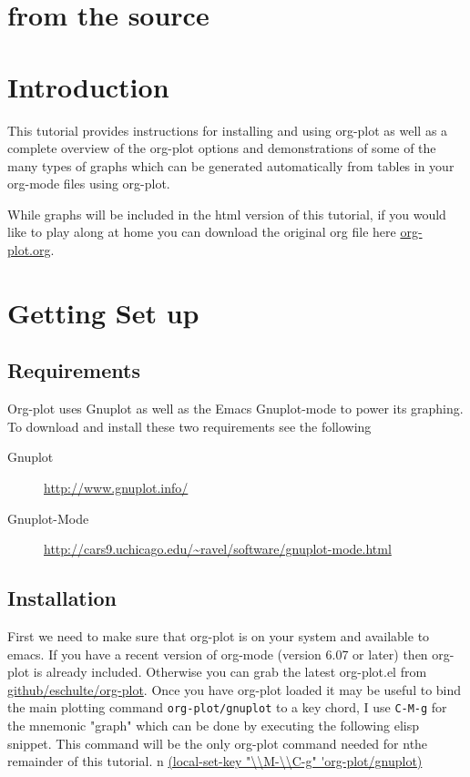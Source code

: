 \documentclass[11pt]{article}
\begin{document}
\begin{center}

\end{center}

\section*{from the source}
\label{sec:org83dc442}

\section*{Introduction}
\label{sec:orgbcc81c8}

This tutorial provides instructions for installing and using org-plot
as well as a complete overview of the org-plot options and
demonstrations of some of the many types of graphs which can be
generated automatically from tables in your org-mode files using
org-plot.

While graphs will be included in the html version of this tutorial, if
you would like to play along at home you can download the original org
file here \href{https://git.sr.ht/\~bzg/worg/tree/master/item/org-tutorials/org-plot.org}{org-plot.org}.

\section*{Getting Set up}
\label{sec:org5e37d6f}

\subsection*{Requirements}
\label{sec:org4ab1f96}

Org-plot uses Gnuplot as well as the Emacs Gnuplot-mode to power its
graphing.  To download and install these two requirements see the
following


\begin{description}
\item[{Gnuplot}] \url{http://www.gnuplot.info/}
\item[{Gnuplot-Mode}] \url{http://cars9.uchicago.edu/\~ravel/software/gnuplot-mode.html}
\end{description}

\subsection*{Installation}
\label{sec:org158604d}
First we need to make sure that org-plot is on your system and
available to emacs.  If you have a recent version of org-mode (version
6.07 or later) then org-plot is already included.  Otherwise you can
grab the latest org-plot.el from \href{http://github.com/eschulte/org-plot/tree/master}{github/eschulte/org-plot}.  Once you
have org-plot loaded it may be useful to bind the main plotting
command \texttt{org-plot/gnuplot} to a key chord, I use \texttt{C-M-g} for the
mnemonic "graph" which can be done by executing the following elisp
snippet.  This command will be the only org-plot command needed for
nthe remainder of this tutorial.
n
\url{(local-set-key "\\M-\\C-g" 'org-plot/gnuplot)}
\end{document}

